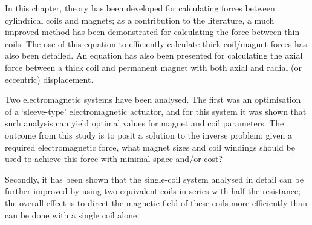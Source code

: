 \documentclass[11pt,a4paper]{memoir}
\begin{document}
In this chapter, theory has been developed for calculating forces between cylindrical coils and magnets; as a contribution to the literature, a much improved method has been demonstrated for calculating the force between thin coils.
The use of this equation to efficiently calculate thick-coil/magnet forces has also been detailed.
An equation has also been presented for calculating the axial force between a thick coil and permanent magnet with both axial and radial (or eccentric) displacement.

Two electromagnetic systems have been analysed.
The first was an optimisation of a `sleeve-type' electromagnetic actuator, and for this system it was shown that such analysis can yield optimal values for magnet and coil parameters.
The outcome from this study is to posit a solution to the inverse problem: given a required electromagnetic force, what magnet sizes and coil windings should be used to achieve this force with minimal space and/or cost?

Secondly, it has been shown that the single-coil system analysed in detail can be further improved by using two equivalent coils in series with half the resistance; the overall effect is to direct the magnetic field of these coils more efficiently than can be done with a single coil alone.
\end{document}
